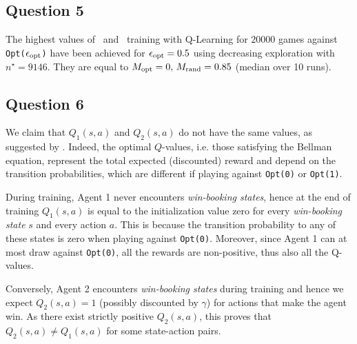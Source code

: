 \documentclass[10pt]{IEEEtran}
\begin{document}
\subsection*{Question 5}
The highest values of \mopt\  and \mrand\  training with Q-Learning for $20000$ games against \texttt{Opt($\epsilon_{\text{opt}}$)} have been achieved for $\epsilon_{\text{opt}} = 0.5$ using decreasing exploration with $n^{\star} = 9146$. They are equal to $M_{\text{opt}} = 0, \, M_{\text{rand}} = 0.85$ (median over 10 runs).

\subsection*{Question 6}
We claim that $Q_1(s,a)$ and $Q_2(s,a)$ do not have the same values, as suggested by .
Indeed, the optimal $Q$-values, i.e. those satisfying the Bellman equation, represent the total expected (discounted) reward and depend on the transition probabilities, which are different if playing against \texttt{Opt(0)} or \texttt{Opt(1)}. 

During training, Agent 1 never encounters \emph{win-booking states}, hence at the end of training $Q_1(s,a)$ is equal to the initialization value zero for every \emph{win-booking state} $s$ and every action $a$. This is because the transition probability to any of these states is zero when playing against \texttt{Opt(0)}. Moreover, since Agent 1 can at most draw against \texttt{Opt(0)}, all the rewards are non-positive,  thus also all the Q-values. 

Conversely, Agent 2 encounters \emph{win-booking states} during training and hence we expect $Q_2(s,a) = 1$ (possibly discounted by $\gamma$) for actions that make the agent win. As there exist strictly positive $Q_2(s,a)$, this proves that $Q_2(s,a) \neq Q_1(s,a)$ for some state-action pairs.
\end{document}
